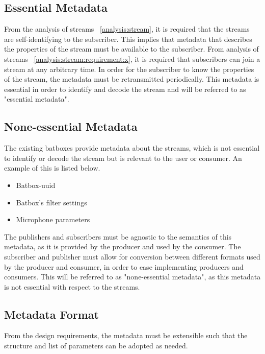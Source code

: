 \subsection{Essential Metadata}
From the analysis of streams ~\ref{analysis:stream}, it is required that the streams are self-identifying to the subscriber. This implies that metadata that describes the properties of the stream must be available to the subscriber.
From analysis of streams ~\ref{analysis:stream:requirement:x}, it is required that subscribers can join a stream at any arbitrary time. In order for the subscriber to know the properties of the stream, the metadata must be retransmitted periodically. This metadata is essential in order to identify and decode the stream and will be referred to as "essential metadata".\\

\subsection{None-essential Metadata}
The existing batboxes provide metadata about the streams, which is not essential to identify or decode the stream but is relevant to the user or consumer. An example of this is listed below.
\begin{itemize}
	\item Batbox-uuid
	\item Batbox's filter settings
	\item Microphone parameters
\end{itemize} 
The publishers and subscribers must be agnostic to the semantics of this metadata, as it is provided by the producer and used by the consumer. The subscriber and publisher must allow for conversion between different formats used by the producer and consumer, in order to ease implementing producers and consumers.
This will be referred to as "none-essential metadata", as this metadata is not essential with respect to the streams.\\

\subsection{Metadata Format}
From the design requirements, the metadata must be extensible such that the structure and list of parameters can be adopted as needed.

